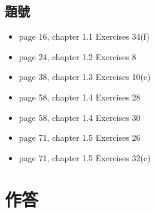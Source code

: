\documentclass[sigconf]{acmart}
\begin{document}
\subsection{題號}
\begin{shaded}
\begin{itemize}
    \item[-] page 16, chapter 1.1 Exercises 34(f)
    \item[-] page 24, chapter 1.2 Exercises 8
    \item[-] page 38, chapter 1.3 Exercises 10(c)
    \item[-] page 58, chapter 1.4 Exercises 28
    \item[-] page 58, chapter 1.4 Exercises 30
    \item[-] page 71, chapter 1.5 Exercises 26
    \item[-] page 71, chapter 1.5 Exercises 32(c)
\end{itemize}
\end{shaded}

\section{作答}
\end{document}
